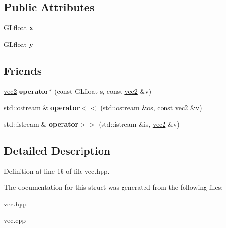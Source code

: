 \subsection*{Public Attributes}
\begin{DoxyCompactItemize}
\item 
\hypertarget{struct_angel_1_1vec2_ab99b91871c08bbf76bf4a5e554ccac8f}{G\-Lfloat {\bfseries x}}\label{struct_angel_1_1vec2_ab99b91871c08bbf76bf4a5e554ccac8f}

\item 
\hypertarget{struct_angel_1_1vec2_a9f0e4c33e7884eca47d771ccfd4ea0bd}{G\-Lfloat {\bfseries y}}\label{struct_angel_1_1vec2_a9f0e4c33e7884eca47d771ccfd4ea0bd}

\end{DoxyCompactItemize}
\subsection*{Friends}
\begin{DoxyCompactItemize}
\item 
\hypertarget{struct_angel_1_1vec2_a1f371c4b26f86deb4d296dfff8ff1fc1}{\hyperlink{struct_angel_1_1vec2}{vec2} {\bfseries operator$\ast$} (const G\-Lfloat s, const \hyperlink{struct_angel_1_1vec2}{vec2} \&v)}\label{struct_angel_1_1vec2_a1f371c4b26f86deb4d296dfff8ff1fc1}

\item 
\hypertarget{struct_angel_1_1vec2_a5533e582fe94db90861caa394494f2cf}{std\-::ostream \& {\bfseries operator$<$$<$} (std\-::ostream \&os, const \hyperlink{struct_angel_1_1vec2}{vec2} \&v)}\label{struct_angel_1_1vec2_a5533e582fe94db90861caa394494f2cf}

\item 
\hypertarget{struct_angel_1_1vec2_af8cf130207f2cf5866ac13049e956c75}{std\-::istream \& {\bfseries operator$>$$>$} (std\-::istream \&is, \hyperlink{struct_angel_1_1vec2}{vec2} \&v)}\label{struct_angel_1_1vec2_af8cf130207f2cf5866ac13049e956c75}

\end{DoxyCompactItemize}


\subsection{Detailed Description}


Definition at line 16 of file vec.\-hpp.



The documentation for this struct was generated from the following files\-:\begin{DoxyCompactItemize}
\item 
vec.\-hpp\item 
vec.\-cpp\end{DoxyCompactItemize}
